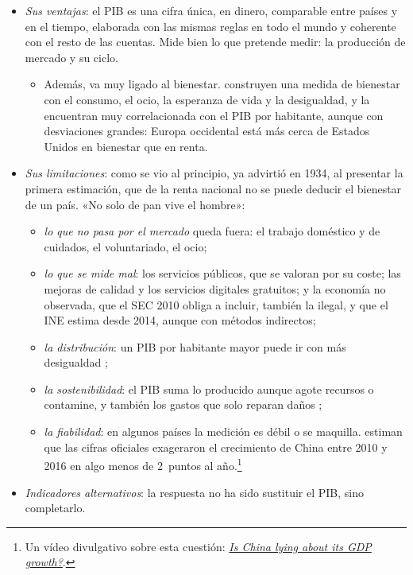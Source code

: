 \documentclass[11pt]{article}
\begin{document}
\begin{itemize}
\item \emph{Sus ventajas}: el PIB es una cifra única, en dinero, comparable entre países y en el tiempo, elaborada con las mismas reglas en todo el mundo y coherente con el resto de las cuentas. Mide bien lo que pretende medir: la producción de mercado y su ciclo.
  \begin{itemize}
  \item Además, va muy ligado al bienestar. \textcite{JonesKlenow2016Beyond} construyen una medida de bienestar con el consumo, el ocio, la esperanza de vida y la desigualdad, y la encuentran muy correlacionada con el PIB por habitante, aunque con desviaciones grandes: Europa occidental está más cerca de Estados Unidos en bienestar que en renta.
  \end{itemize}
\item \emph{Sus limitaciones}: como se vio al principio,  ya advirtió en 1934, al presentar la primera estimación, que de la renta nacional no se puede deducir el bienestar de un país\nocite{Kuznets1934NationalIncome}. «No solo de pan vive el hombre»:
  \begin{itemize}
  \item \emph{lo que no pasa por el mercado} queda fuera: el trabajo doméstico y de cuidados, el voluntariado, el ocio;
  \item \emph{lo que se mide mal}: los servicios públicos, que se valoran por su coste; las mejoras de calidad y los servicios digitales gratuitos; y la economía no observada, que el SEC 2010 obliga a incluir, también la ilegal, y que el INE estima desde 2014, aunque con métodos indirectos\nocite{SEC2010,INE2014Base2010};
  \item \emph{la distribución}: un PIB por habitante mayor puede ir con más desigualdad ;
  \item \emph{la sostenibilidad}: el PIB suma lo producido aunque agote recursos o contamine, y también los gastos que solo reparan daños ;
  \item \emph{la fiabilidad}: en algunos países la medición es débil o se maquilla. \textcite{ChenEtAl2019Forensic} estiman que las cifras oficiales exageraron el crecimiento de China entre 2010 y 2016 en algo menos de 2~puntos al año.\footnote{Un vídeo divulgativo sobre esta cuestión: \href{https://youtu.be/G632a6M2hC0}{\emph{Is China lying about its GDP growth?}}\nocite{VisualPolitik2019China}.}
  \end{itemize}
\item \emph{Indicadores alternativos}: la respuesta no ha sido sustituir el PIB, sino completarlo.

\end{itemize}
\end{document}

